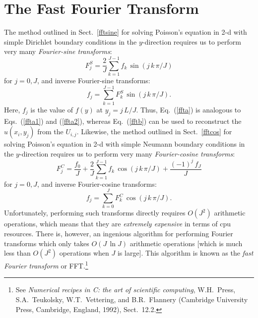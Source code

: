 \section{The Fast Fourier Transform}\label{sfft}
The method outlined in Sect.~\ref{fftsine} for solving Poisson's equation in 2-d with
simple Dirichlet boundary conditions in the $y$-direction requires us to perform very many
{\em Fourier-sine transforms}:
\begin{equation}\label{ffta}
F_j^S = \frac{2}{J}\sum_{k=1}^{J-1} f_k\,\sin(j\,k\,\pi/J)
\end{equation}
for $j=0,J$, and inverse Fourier-sine transforms:
\begin{equation}\label{fftb}
f_j= \sum_{k=1}^{J-1} F_k^S\,\sin(j\,k\,\pi/J).
\end{equation}
Here, $f_j$ is the value of $f(y)$ at $y_j = j\,L/J$. 
Thus, Eq.~(\ref{ffta}) is analogous to Eqs.~(\ref{ffta1}) and (\ref{ffta2}), whereas
Eq.~(\ref{fftb}) can be used to reconstruct the $u(x_i,y_j)$ from the $U_{i,j}$.
Likewise, the 
method outlined in Sect.~\ref{fftcos} for solving Poisson's equation in 2-d with
simple Neumann boundary conditions in the $y$-direction requires us to perform very many
{\em Fourier-cosine transforms}:
\begin{equation}
F_j^C = \frac{f_0}{J} + \frac{2}{J}\sum_{k=1}^{J-1} f_k\,\cos(j\,k\,\pi/J)
+ \frac{(-1)^j\,f_J}{J}
\end{equation}
for $j=0,J$, and inverse Fourier-cosine transforms:
\begin{equation}
f_j= \sum_{k=0}^{J} F_k^C\,\cos(j\,k\,\pi/J).
\end{equation}
Unfortunately, performing such transforms directly requires $O(J^2)$ arithmetic
operations, which means that they are {\em extremely expensive} in terms of cpu resources.
 There is, however, an ingenious
algorithm for performing Fourier transforms which only takes $O(J\,\ln J)$ arithmetic
operations [which is much less than $O(J^2)$ operations when $J$ is large].
This algorithm is known as the {\em fast Fourier transform} or FFT.\footnote{See {\em Numerical recipes in C: the
art of scientific computing}, W.H.~Press, S.A.~Teukolsky, W.T.~Vettering, and
B.R.~Flannery (Cambridge University Press, Cambridge, England, 1992), Sect.~12.2.}

